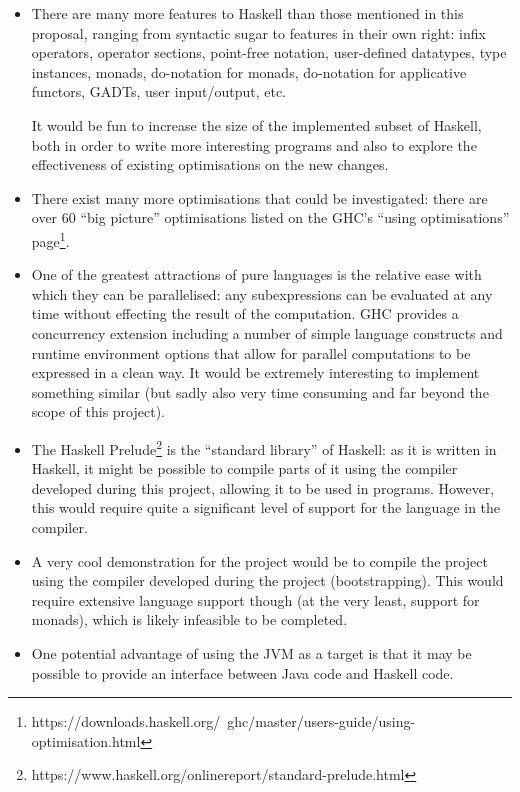 \documentclass[12pt]{article}
\begin{document}
\begin{itemize}
\item
{
    There are many more features to Haskell than those mentioned in this proposal, ranging from syntactic sugar to
    features in their own right: infix operators, operator sections, point-free notation, user-defined datatypes, type
    instances, monads, do-notation for monads, do-notation for applicative functors, GADTs, user input/output, etc.

    It would be fun to increase the size of the implemented subset of Haskell, both in order to write more interesting
    programs and also to explore the effectiveness of existing optimisations on the new changes.
}
\item
{
    There exist many more optimisations that could be investigated: there are over 60 ``big picture'' optimisations
    listed on the GHC's ``using optimisations''
    page\footnote{https://downloads.haskell.org/~ghc/master/users-guide/using-optimisation.html}.
}
\item
{
    One of the greatest attractions of pure languages is the relative ease with which they can be parallelised: any
    subexpressions can be evaluated at any time without effecting the result of the computation. GHC provides a
    concurrency extension including a number of simple language constructs and runtime environment options that allow
    for parallel computations to be expressed in a clean way. It would be extremely interesting to implement something
    similar (but sadly also very time consuming and far beyond the scope of this project).
}
\item
{
    The Haskell Prelude\footnote{https://www.haskell.org/onlinereport/standard-prelude.html} is the ``standard library''
    of Haskell: as it is written in Haskell, it might be possible to compile parts of it using the compiler developed
    during this project, allowing it to be used in programs. However, this would require quite a significant level of
    support for the language in the compiler.
}
\item
{
    A very cool demonstration for the project would be to compile the project using the compiler developed during the
    project (bootstrapping). This would require extensive language support though (at the very least, support for
    monads), which is likely infeasible to be completed.
}
\item
{
    One potential advantage of using the JVM as a target is that it may be possible to provide an interface between Java
    code and Haskell code.
}
\end{itemize}
\end{document}
